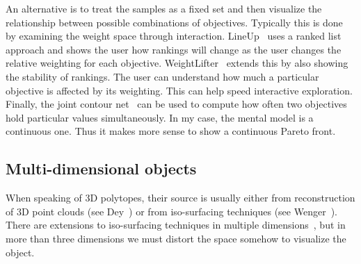 An alternative is to treat the samples as a fixed set and then visualize the
relationship between possible combinations of objectives. Typically this is
done by examining the weight space through interaction. 
LineUp~\cite{Gratzl:2013} uses a ranked list approach and shows the user
how rankings will change as the user changes the relative weighting for each
objective. WeightLifter~\cite{Pajer:2016} extends this by also showing the
stability of rankings. The user can understand how much a particular objective
is affected by its weighting. This can help speed interactive exploration. 
Finally, the joint contour net~\cite{Carr:2014} can be used to compute how
often two objectives hold particular values simultaneously. 
In my case, the mental model is a continuous one. Thus it makes more sense
to show a continuous Pareto front.

\subsection{Multi-dimensional objects}



When speaking of 3D polytopes, their source is usually either from reconstruction of 3D point clouds 
(see Dey~\cite{Dey:2006})
or from iso-surfacing techniques (see Wenger~\cite{Wenger:2013}).
%
There are extensions to iso-surfacing techniques in multiple dimensions~\cite{Bhaniramka:2000}, 
but in more than three dimensions we must distort the space somehow to visualize the object. 

